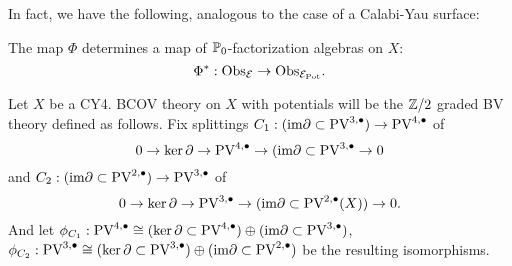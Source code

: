 \documentclass[11pt]{article}
\begin{document}
In fact, we have the following, analogous to the case of a Calabi-Yau surface:
\begin{prop}
The map $\Phi$ determines a map of $\mathbb{P}_0$-factorization algebras on $X$:
\[
\Phi^* : {\rm Obs}_{\mathcal{E}} \to {\rm Obs}_{\mathcal{E}_{\rm Pot}} .
\]
\end{prop} 

\iffalse
Let \(X\) be a CY4. BCOV theory on \(X\) with potentials will be the \(\mathbb{Z}/2\) graded BV theory defined as follows. Fix splittings \(C_1: (\text{im}\partial\subset\text{PV}^{3,\bullet})\to \text{PV}^{4,\bullet}\) of  \[0\to\ker\partial\to \text{PV}^{4,\bullet}\to(\text{im}\partial\subset\text{PV}^{3,\bullet}\to 0\] and \(C_2: (\text{im}\partial\subset\text{PV}^{2,\bullet})\to\text{PV}^{3,\bullet}\) of \[0\to\ker\partial\to\text{PV}^{3,\bullet}\to(\text{im}\partial\subset\text{PV}^{2,\bullet}(X))\to 0.\] And let \(\phi_{C_1} : \text{PV}^{4,\bullet}\cong(\ker\partial\subset\text{PV}^{4,\bullet})\oplus(\text{im}\partial\subset\text{PV}^{3,\bullet})\), \(\phi_{C_2}: \text{PV}^{3,\bullet}\cong(\ker\partial\subset\text{PV}^{3,\bullet})\oplus(\text{im}\partial\subset\text{PV}^{2,\bullet})\) be the resulting isomorphisms.
\end{document}
